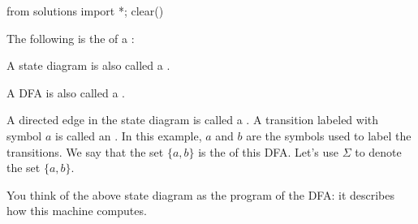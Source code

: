 \begin{python0}
from solutions import *; clear()
\end{python0}

The following is the
of a
\sidebarskip{16pt}\sidebarskip{0pt}:



A state diagram is also called a .

A DFA is also called a
\sidebarskip{16pt}\sidebarskip{0pt}.


A directed edge in the state diagram is called a
.
A transition labeled with symbol $a$ is called an
.
In this example, $a$ and $b$ are the symbols used to label the transitions.
We say that the set $\{a, b\}$ is the  of this DFA.
Let's use $\Sigma$ to denote the set $\{a, b\}$.

You think of the above state diagram as the program of the DFA:
it describes how this machine computes.

